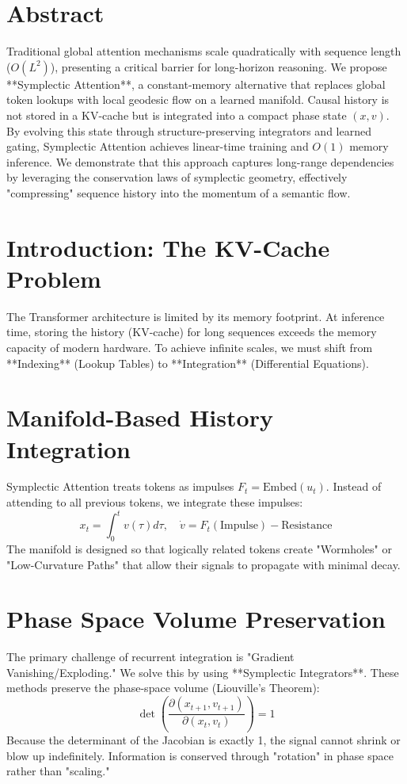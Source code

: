 \documentclass[11pt,a4paper]{report}
\begin{document}
\section{Abstract}
Traditional global attention mechanisms scale quadratically with sequence length ($O(L^2)$), presenting a critical barrier for long-horizon reasoning. We propose **Symplectic Attention**, a constant-memory alternative that replaces global token lookups with local geodesic flow on a learned manifold. Causal history is not stored in a KV-cache but is integrated into a compact phase state $(x, v)$. By evolving this state through structure-preserving integrators and learned gating, Symplectic Attention achieves linear-time training and $O(1)$ memory inference. We demonstrate that this approach captures long-range dependencies by leveraging the conservation laws of symplectic geometry, effectively "compressing" sequence history into the momentum of a semantic flow.

\section{Introduction: The KV-Cache Problem}
The Transformer architecture is limited by its memory footprint. At inference time, storing the history (KV-cache) for long sequences exceeds the memory capacity of modern hardware. To achieve infinite scales, we must shift from **Indexing** (Lookup Tables) to **Integration** (Differential Equations).

\section{Manifold-Based History Integration}
Symplectic Attention treats tokens as impulses $F_t = \text{Embed}(u_t)$. Instead of attending to all previous tokens, we integrate these impulses:
\begin{equation}
    x_{t} = \int_{0}^{t} v(\tau) d\tau, \quad \dot{v} = F_t(\text{Impulse}) - \text{Resistance}
\end{equation}
The manifold is designed so that logically related tokens create "Wormholes" or "Low-Curvature Paths" that allow their signals to propagate with minimal decay.

\section{Phase Space Volume Preservation}
The primary challenge of recurrent integration is "Gradient Vanishing/Exploding." We solve this by using **Symplectic Integrators**. These methods preserve the phase-space volume (Liouville's Theorem):
\begin{equation}
    \operatorname{det} \left( \frac{\partial (x_{t+1}, v_{t+1})}{\partial (x_t, v_t)} \right) = 1
\end{equation}
Because the determinant of the Jacobian is exactly 1, the signal cannot shrink or blow up indefinitely. Information is conserved through "rotation" in phase space rather than "scaling."
\end{document}

